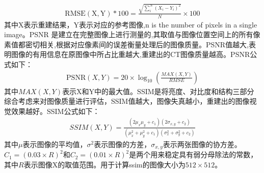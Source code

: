 \begin{equation}
\begin{aligned}
\mathrm{RMSE(X,Y)*100} =  \frac{ \sqrt{\sum_{i}^N (X_i - Y_i)^2}}{N} \times 100   
\end{aligned}
\end{equation}
其中X表示重建结果，Y表示对应的参考图像,n is the number of pixels in a single image。PSNR 是建立在完整图像上进行测量的,其取值与图像位置空间上的所有像素值都密切相关,根据对应像素间的误差衡量处理后的图像质量。PSNR值越大,表明图像的有用信息在原图像中所占比重越大,重建出的CT图像质量越高。PSNR公式如下：
\begin{equation}
\begin{aligned}
\mathrm{PSNR}(X,Y) = 20\times\log_{10}(\frac{MAX(X,Y)}{RMSE})
\end{aligned}
\end{equation}
其中$MAX(X,Y)$表示X和Y中的最大值。SSIM是将亮度、对比度和结构三部分综合考虑来对图像质量进行评估，SSIM值越大，图像失真越小，重建出的图像视觉效果越好。SSIM公式如下：
\begin{equation}
\begin{aligned}
SSIM(X,Y) = \frac{(2\mu_x\mu_y+c_1)(2\sigma_{x,y}+c_2)}{(\mu^2_x+\mu^2_y+c_1)(\sigma^2_x+\sigma^2_y+c_2)}
\end{aligned}
\end{equation}
其中$\mu$表示图像的平均值，$\sigma^2$表示图像的方差，$\sigma_{x,y}$表示两张图像的协方差。$C_1 = (0.03\times R)^2$和$C_2 = (0.01\times R)^2$是两个用来稳定具有弱分母除法的常数，其中$R$表示图像X的取值范围。用于计算ssim的图像大小为$512\times 512$。

